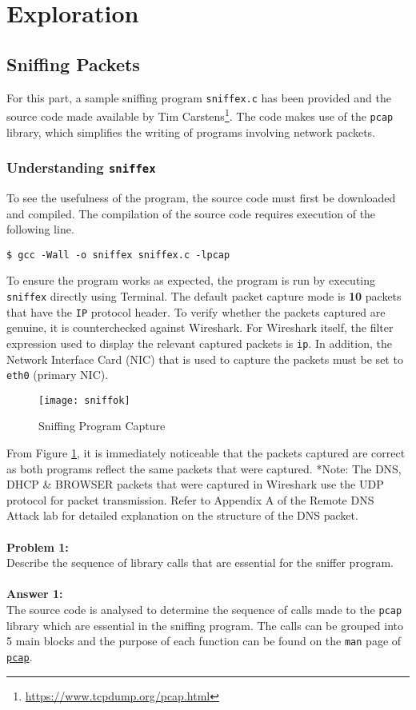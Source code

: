\documentclass[a4paper,12pt]{article}
\begin{document}
\section{Exploration}
\subsection{Sniffing Packets}
For this part, a sample sniffing program \texttt{sniffex.c} has been provided and the source code made available by Tim Carstens\footnote{\url{https://www.tcpdump.org/pcap.html}}. The code makes use of the \texttt{pcap} library, which simplifies the writing of programs involving network packets.
\subsubsection{Understanding \texttt{sniffex}}
To see the usefulness of the program, the source code must first be downloaded and compiled. The compilation of the source code requires execution of the following line.
\begin{verbatim}
$ gcc -Wall -o sniffex sniffex.c -lpcap
\end{verbatim}
To ensure the program works as expected, the program is run by executing \texttt{sniffex} directly using Terminal. The default packet capture mode is \textbf{10} packets that have the \texttt{IP} protocol header. To verify whether the packets captured are genuine, it is counterchecked against Wireshark. For Wireshark itself, the filter expression used to display the relevant captured packets is \texttt{ip}. In addition, the Network Interface Card (NIC) that is used to capture the packets must be set to \texttt{eth0} (primary NIC).

\begin{figure}[H]
\centering
\texttt{[image: sniffok]}
\caption{Sniffing Program Capture}
\label{fig:sniffok}
\end{figure}

\noindent From Figure \ref{fig:sniffok}, it is immediately noticeable that the packets captured are correct as both programs reflect the same packets that were captured. *Note: The DNS, DHCP \& BROWSER packets that were captured in Wireshark use the UDP protocol for packet transmission. Refer to Appendix A of the Remote DNS Attack lab for detailed explanation on the structure of the DNS packet.\\\\
\noindent
\textbf{Problem 1:}\\ Describe the sequence of library calls that are essential for the sniffer program.\\\\
\textbf{Answer 1:}\\
The source code is analysed to determine the sequence of calls made to the \texttt{pcap} library which are essential in the sniffing program. The calls can be grouped into 5 main blocks and the purpose of each function can be found on the \texttt{man} page of \href{http://www.tcpdump.org/manpages/pcap.3pcap.html}{\texttt{pcap}}.
\end{document}

